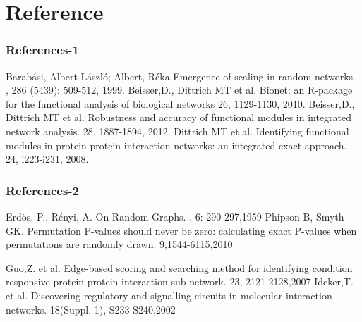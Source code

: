 \documentclass[10pt]{beamer}
\begin{document}
\section{Reference}
\begin{frame}
	\frametitle<presentation>{References-1}    
	\begin{thebibliography}{6}    
		\beamertemplatearticlebibitems
		Barab\'{a}si, Albert-L\'{a}szl\'{o}; Albert, R\'{e}ka 
		\newblock Emergence of scaling in random networks. 
		, 286 (5439): 509-512, 1999.
		Beisser,D.,  Dittrich MT  et al. 
		\newblock Bionet: an R-package for the functional analysis of biological networks
		 26, 1129-1130, 2010.
			Beisser,D.,  Dittrich MT  et al. 
			\newblock Robustness and accuracy of functional modules in integrated network analysis.  
			 28, 1887-1894, 2012.
				Dittrich MT  et al. 
				\newblock Identifying functional modules in protein-protein interaction networks: an integrated exact approach. 
				 24, i223-i231, 2008.
	\end{thebibliography}
\end{frame}

\begin{frame}
	\frametitle<presentation>{References-2}    
	\begin{thebibliography}{6}    
	
				\beamertemplatearticlebibitems
     Erd\"{o}s, P., R\'{e}nyi, A.
		\newblock On Random Graphs. 
		, 6: 290-297,1959
			\beamertemplatearticlebibitems
			Phipson B, Smyth GK. 
			\newblock 	Permutation P-values should never be zero: calculating exact P-values when permutations are randomly drawn.	 9,1544-6115,2010	
				
Guo,Z. et al.  \newblock Edge-based scoring and searching method for identifying condition responsive protein-protein interaction sub-network.  23, 2121-2128,2007
Ideker,T. et al. \newblock Discovering regulatory and signalling circuits in molecular interaction networks.  18(Suppl. 1), S233-S240,2002
	\end{thebibliography}
\end{frame}
\end{document}
